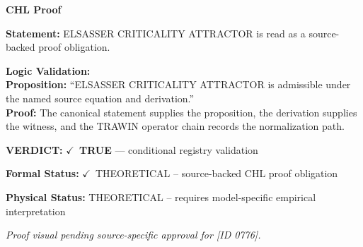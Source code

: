 \vspace{0.45em}
\noindent\textbf{CHL Proof}\par
\textbf{Statement:} ELSASSER CRITICALITY ATTRACTOR is read as a source-backed proof obligation.

\textbf{Logic Validation:}\\
\textbf{Proposition:} ``ELSASSER CRITICALITY ATTRACTOR is admissible under the named source equation and derivation.''\\
\textbf{Proof:} The canonical statement supplies the proposition, the derivation supplies the witness, and the TRAWIN operator chain records the normalization path.

\textbf{VERDICT:} \ensuremath{\checkmark}\ \textbf{TRUE} --- conditional registry validation

\textbf{Formal Status:} \ensuremath{\checkmark}\ THEORETICAL -- source-backed CHL proof obligation

\textbf{Physical Status:} THEORETICAL -- requires model-specific empirical interpretation
\par\vspace{0.45em}
\par
\vfill
\begingroup\footnotesize\itshape
Proof visual pending source-specific approval for [ID 0776].
\par\endgroup
\vfill
\endgroup
\endgroup
